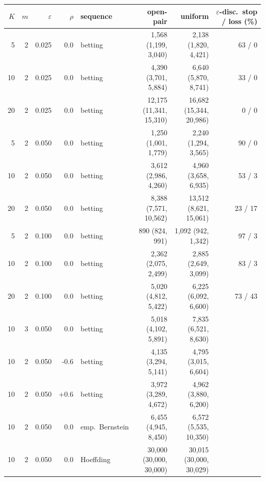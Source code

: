 \begin{tabular}{rrrrlrrr}
\toprule
$K$ & $m$ & $\varepsilon$ & $\rho$ & sequence & open-pair & uniform & $\varepsilon$-disc.\ stop / loss (\%) \\
\midrule
5 & 2 & 0.025 & 0.0 & betting & 1,568 (1,199, 3,040) & 2,138 (1,820, 4,421) & 63 / 0 \\
10 & 2 & 0.025 & 0.0 & betting & 4,390 (3,701, 5,884) & 6,640 (5,870, 8,741) & 33 / 0 \\
20 & 2 & 0.025 & 0.0 & betting & 12,175 (11,341, 15,310) & 16,682 (15,344, 20,986) & 0 / 0 \\
5 & 2 & 0.050 & 0.0 & betting & 1,250 (1,001, 1,779) & 2,240 (1,294, 3,565) & 90 / 0 \\
10 & 2 & 0.050 & 0.0 & betting & 3,612 (2,986, 4,260) & 4,960 (3,658, 6,935) & 53 / 3 \\
20 & 2 & 0.050 & 0.0 & betting & 8,388 (7,571, 10,562) & 13,512 (8,621, 15,061) & 23 / 17 \\
5 & 2 & 0.100 & 0.0 & betting & 890 (824, 991) & 1,092 (942, 1,342) & 97 / 3 \\
10 & 2 & 0.100 & 0.0 & betting & 2,362 (2,075, 2,499) & 2,885 (2,649, 3,099) & 83 / 3 \\
20 & 2 & 0.100 & 0.0 & betting & 5,020 (4,812, 5,422) & 6,225 (6,092, 6,600) & 73 / 43 \\
10 & 3 & 0.050 & 0.0 & betting & 5,018 (4,102, 5,891) & 7,835 (6,521, 8,630) &  \\
10 & 2 & 0.050 & -0.6 & betting & 4,135 (3,294, 5,141) & 4,795 (3,015, 6,604) &  \\
10 & 2 & 0.050 & +0.6 & betting & 3,972 (3,289, 4,672) & 4,962 (3,880, 6,200) &  \\
10 & 2 & 0.050 & 0.0 & emp.\ Bernstein & 6,455 (4,945, 8,450) & 6,572 (5,535, 10,350) &  \\
10 & 2 & 0.050 & 0.0 & Hoeffding & 30,000 (30,000, 30,000) & 30,015 (30,000, 30,029) &  \\
\bottomrule
\end{tabular}
